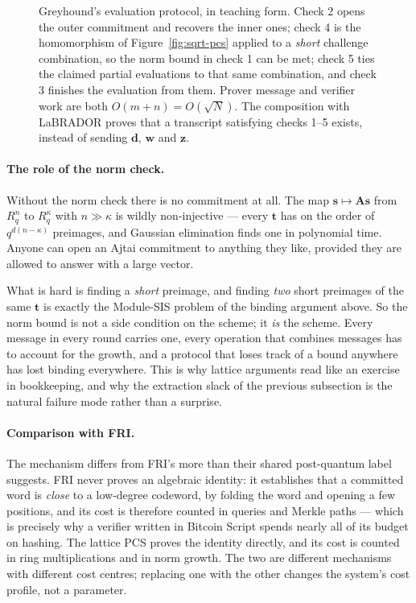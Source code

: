 \begin{figure}[H]
\begin{protocol}
\begin{tabular}{@{}p{0.34\linewidth}@{}p{0.26\linewidth}@{}p{0.40\linewidth}@{}}
\end{tabular}
\end{protocol}
\caption{Greyhound's evaluation protocol, in teaching form. Check 2 opens the
outer commitment and recovers the inner ones; check 4 is the homomorphism of
Figure~\ref{fig:sqrt-pcs} applied to a \emph{short} challenge combination, so
the norm bound in check 1 can be met; check 5 ties the claimed partial
evaluations to that same combination, and check 3 finishes the evaluation from
them. Prover message and verifier work are both $O(m+n)=O(\sqrt{N})$. The
composition with LaBRADOR proves that a transcript satisfying checks 1--5
exists, instead of sending $\mathbf{d}$, $\mathbf{w}$ and $\mathbf{z}$.}
\label{fig:greyhound-eval}
\end{figure}

\paragraph{The role of the norm check.}
Without the norm check there is no commitment at all. The map $\mathbf{s}\mapsto\mathbf{A}\mathbf{s}$ from $R_q^{n}$ to
$R_q^{\kappa}$ with $n\gg\kappa$ is wildly non-injective --- every $\mathbf{t}$
has on the order of $q^{d(n-\kappa)}$ preimages, and Gaussian elimination finds
one in polynomial time. Anyone can open an Ajtai commitment to anything they
like, provided they are allowed to answer with a large vector.

What is hard is finding a \emph{short} preimage, and finding \emph{two} short
preimages of the same $\mathbf{t}$ is exactly the Module-SIS problem of the
binding argument above. So the norm bound is not a side condition on the scheme;
it \emph{is} the scheme. Every message in every round carries one, every
operation that combines messages has to account for the growth, and a protocol
that loses track of a bound anywhere has lost binding everywhere. This is why
lattice arguments read like an exercise in bookkeeping, and why the extraction
slack of the previous subsection is the natural failure mode rather than a
surprise.

\paragraph{Comparison with FRI.}
The mechanism differs from FRI's more than their shared post-quantum label
suggests. FRI never proves an algebraic identity: it establishes that a committed word is \emph{close} to a low-degree
codeword, by folding the word and opening a few positions, and its cost is
therefore counted in queries and Merkle paths --- which is precisely why a
verifier written in Bitcoin Script spends nearly all of its budget on hashing.
The lattice PCS proves the identity directly, and its cost is counted in ring
multiplications and in norm growth. The two are different mechanisms with
different cost centres; replacing one with the other changes the system's cost
profile, not a parameter.

